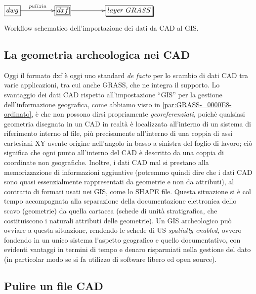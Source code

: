 	\begin{table}
		\centering
		$\xymatrix@C=50pt{*+[F]{dwg}\ar[r]^{pulizia} & *+[F=]{dxf}\ar[r] & *+[F-,]{layer~GRASS}}$
		\caption{{\small Workflow schematico dell'importazione dei dati da CAD al GIS.}}
	\end{table}

	\subsection{La geometria archeologica nei CAD}
		Oggi il formato dxf è oggi uno standard \emph{de facto} per lo scambio di dati CAD tra varie applicazioni, tra cui anche GRASS, che ne integra il supporto. Lo svantaggio dei dati CAD rispetto all'impostazione ``GIS'' per la gestione dell'informazione geografica, come abbiamo visto in \textsection\ref{par:GRASS-=0000E8-ordinato}, è che non possono dirsi propriamente \emph{georeferenziati}, poichè qualsiasi geometria disegnata in un CAD in realtà è localizzata all'interno di un sistema di riferimento interno al file, più precisamente all'interno di una coppia di assi cartesiani XY avente origine nell'angolo in basso a sinistra del foglio di lavoro; ciò significa che ogni punto all'interno del CAD è descritto da una coppia di coordinate non geografiche.  Inoltre, i dati CAD mal si prestano alla memorizzazione di informazioni aggiuntive (potremmo quindi dire che i dati CAD sono quasi essenzialmente rappresentati da geometrie e non da attributi), al contrario di formati usati nei GIS, come lo SHAPE file. Questa situazione si è col tempo accompagnata alla separazione della documentazione elettronica dello scavo (geometrie) da quella cartacea (schede di unità stratigrafica, che costituiscono i naturali attributi delle geometrie). Un GIS archeologico può ovviare a questa situazione, rendendo le schede di US \emph{spatially enabled}, ovvero fondendo in un unico sistema l'aspetto geografico e quello documentativo, con evidenti vantaggi in termini di tempo e denaro risparmiati nella gestione del dato (in particolar modo se si fa utilizzo di software libero ed open source).

	\subsection{Pulire un file CAD}

